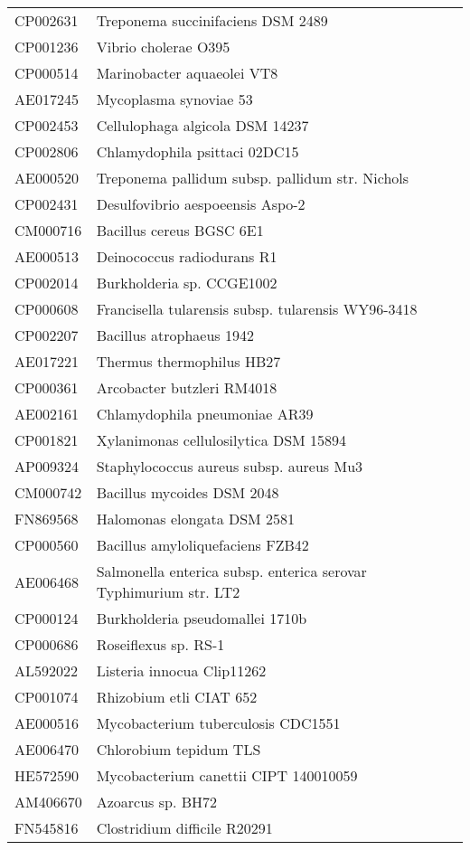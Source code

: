 \begin{longtable}{ll}
CP002631 & Treponema succinifaciens DSM 2489\\
CP001236 & Vibrio cholerae O395\\
CP000514 & Marinobacter aquaeolei VT8\\
AE017245 & Mycoplasma synoviae 53\\
CP002453 & Cellulophaga algicola DSM 14237\\
CP002806 & Chlamydophila psittaci 02DC15\\
AE000520 & Treponema pallidum subsp. pallidum str. Nichols\\
CP002431 & Desulfovibrio aespoeensis Aspo-2\\
CM000716 & Bacillus cereus BGSC 6E1\\
AE000513 & Deinococcus radiodurans R1\\
CP002014 & Burkholderia sp. CCGE1002\\
CP000608 & Francisella tularensis subsp. tularensis WY96-3418\\
CP002207 & Bacillus atrophaeus 1942\\
AE017221 & Thermus thermophilus HB27\\
CP000361 & Arcobacter butzleri RM4018\\
AE002161 & Chlamydophila pneumoniae AR39\\
CP001821 & Xylanimonas cellulosilytica DSM 15894\\
AP009324 & Staphylococcus aureus subsp. aureus Mu3\\
CM000742 & Bacillus mycoides DSM 2048\\
FN869568 & Halomonas elongata DSM 2581\\
CP000560 & Bacillus amyloliquefaciens FZB42\\
AE006468 & Salmonella enterica subsp. enterica serovar Typhimurium str. LT2\\
CP000124 & Burkholderia pseudomallei 1710b\\
CP000686 & Roseiflexus sp. RS-1\\
AL592022 & Listeria innocua Clip11262\\
CP001074 & Rhizobium etli CIAT 652\\
AE000516 & Mycobacterium tuberculosis CDC1551\\
AE006470 & Chlorobium tepidum TLS\\
HE572590 & Mycobacterium canettii CIPT 140010059\\
AM406670 & Azoarcus sp. BH72\\
FN545816 & Clostridium difficile R20291\\

\end{longtable}
